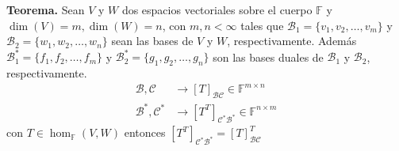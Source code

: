 \textbf{Teorema.} Sean $V$ y $W$  dos espacios vectoriales
sobre el cuerpo $\mathbb{F}$ y $\dim(V) = m, \dim(W) = n$,
con $m,n < \infty$ tales que $\mathcal{B}_1=\{v_1,v_2,\dots,v_m\}$ y
$\mathcal{B}_2=\{w_1,w_2,\dots,w_n\}$ sean las bases de $V$ y
$W$, respectivamente. Además $\mathcal{B}_1^{\ast}=\{f_1,f_2,
\dots,f_m\}$ y $\mathcal{B}_2^{\ast}=\{g_1,g_2,\dots,g_n\}$
son las bases duales de $\mathcal{B}_1$ y $\mathcal{B}_2$,
respectivamente.  
\begin{align*}
    \mathcal{B},\mathcal{C}&\to [T]_{\mathcal{B}\mathcal{C}}
    \in \mathbb{F}^{m\times n}\\
    \mathcal{B}^{\ast},\mathcal{C}^{\ast}&\to [T^{T}]_{\mathcal
    {C}^{\ast}\mathcal{B}^{\ast}}\in\mathbb{F}^{n\times m}
\end{align*}
con $T \in \hom_{\mathbb{F}}(V,W)$ entonces
$[T^{T}]_{\mathcal{C}^{\ast}\mathcal{B}^{\ast}}
=[T]_{\mathcal{B}\mathcal{C}}^{T}$

